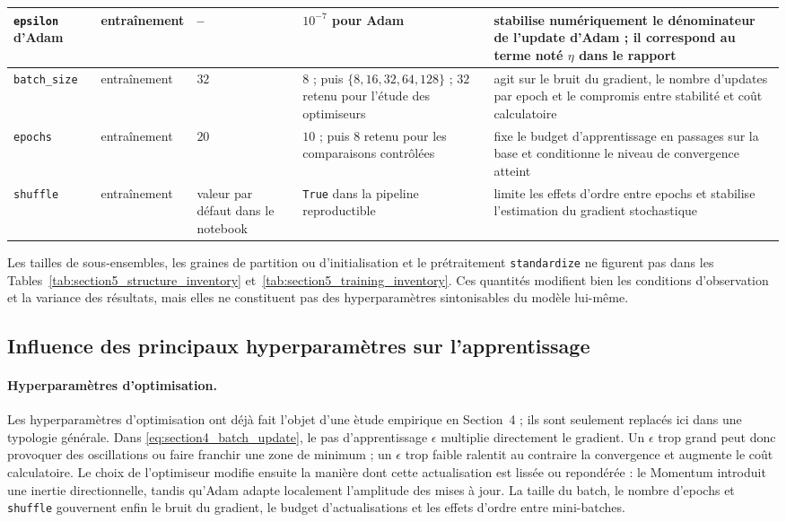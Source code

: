 \begin{table}[t]
\begin{tabular}{|p{2.2cm}|p{2.7cm}|p{2.5cm}|p{3.7cm}|p{5.5cm}|}
\hline
\texttt{epsilon} d'Adam & entra\^inement & -- & $10^{-7}$ pour Adam & stabilise num\'eriquement le d\'enominateur de l'update d'Adam ; il correspond au terme not\'e $\eta$ dans le rapport \\
\hline
\texttt{batch\_size} & entra\^inement & $32$ & $8$ ; puis $\{8,16,32,64,128\}$ ; $32$ retenu pour l'\'etude des optimiseurs & agit sur le bruit du gradient, le nombre d'updates par epoch et le compromis entre stabilit\'e et co\^ut calculatoire \\
\hline
\texttt{epochs} & entra\^inement & $20$ & $10$ ; puis $8$ retenu pour les comparaisons contr\^ol\'ees & fixe le budget d'apprentissage en passages sur la base et conditionne le niveau de convergence atteint \\
\hline
\texttt{shuffle} & entra\^inement & valeur par d\'efaut dans le notebook & \texttt{True} dans la pipeline reproductible & limite les effets d'ordre entre epochs et stabilise l'estimation du gradient stochastique \\
\hline
\end{tabular}
\end{table}

Les tailles de sous-ensembles, les graines de partition ou d'initialisation et le pr\'etraitement \texttt{standardize} ne figurent pas dans les Tables~\ref{tab:section5_structure_inventory} et~\ref{tab:section5_training_inventory}. Ces quantit\'es modifient bien les conditions d'observation et la variance des r\'esultats, mais elles ne constituent pas des hyperparam\`etres sintonisables du mod\`ele lui-m\^eme.

\subsection{Influence des principaux hyperparam\`etres sur l'apprentissage}
\paragraph{Hyperparam\`etres d'optimisation.}
Les hyperparam\`etres d'optimisation ont d\'ej\`a fait l'objet d'une \`etude empirique en Section~4 ; ils sont seulement replac\'es ici dans une typologie g\'en\'erale. Dans \eqref{eq:section4_batch_update}, le pas d'apprentissage $\epsilon$ multiplie directement le gradient. Un $\epsilon$ trop grand peut donc provoquer des oscillations ou faire franchir une zone de minimum ; un $\epsilon$ trop faible ralentit au contraire la convergence et augmente le co\^ut calculatoire. Le choix de l'optimiseur modifie ensuite la mani\`ere dont cette actualisation est liss\'ee ou repond\'er\'ee : le Momentum introduit une inertie directionnelle, tandis qu'Adam adapte localement l'amplitude des mises \`a jour. La taille du batch, le nombre d'epochs et \texttt{shuffle} gouvernent enfin le bruit du gradient, le budget d'actualisations et les effets d'ordre entre mini-batches.

